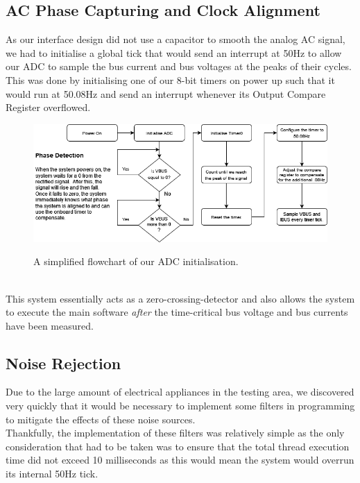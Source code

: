 \documentclass[9pt, technote, a4paper, nofonttune]{IEEEphot}
\begin{document}
        \subsection{AC Phase Capturing and Clock Alignment}
        \hspace{0.5cm}As our interface design did not use a capacitor to smooth the analog AC signal, we had to initialise a global tick that would send an interrupt at 50Hz to allow our ADC to sample the bus current and bus voltages at the peaks of their cycles.  This was done by initialising one of our 8-bit timers on power up such that it would run at 50.08Hz and send an interrupt whenever its Output Compare Register overflowed.  
        \begin{figure}[h]
        \centering
        \includegraphics[width=35pc]{D5/System.drawio.png}
        \label{fig_env1}
        \caption{A simplified flowchart of our ADC initialisation.}
        \end{figure}
        \\
        This system essentially acts as a zero-crossing-detector and also allows the system to execute the main software \emph{after} the time-critical bus voltage and bus currents have been measured.  
        \subsection{Noise Rejection}
        \hspace{0.5cm}Due to the large amount of electrical appliances in the testing area, we discovered very quickly that it would be necessary to implement some filters in programming to mitigate the effects of these noise sources.\\Thankfully, the implementation of these filters was relatively simple as the only consideration that had to be taken was to ensure that the total thread execution time did not exceed 10 milliseconds as this would mean the system would overrun its internal 50Hz tick.
\end{document}
